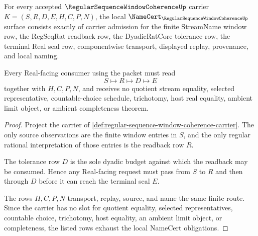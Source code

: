 \begin{theorem}
\label{thm:regular-sequence-window-coherence-namecert-obligations}
For every accepted $\RegularSequenceWindowCoherenceUp$ carrier $K=(S,R,D,E,H,C,P,N)$, the local $\NameCert_{\RegularSequenceWindowCoherenceUp}$ surface consists exactly of carrier admission for the finite StreamName window row, the RegSeqRat readback row, the DyadicRatCore tolerance row, the terminal Real seal row, componentwise transport, displayed replay, provenance, and local naming.

Every Real-facing consumer using the packet must read
$$
S\longmapsto R\longmapsto D\longmapsto E
$$
together with $H,C,P,N$, and receives no quotient stream equality, selected representative, countable-choice schedule, trichotomy, host real equality, ambient limit object, or ambient completeness theorem.
\end{theorem}
\begin{proof}
Project the carrier of \autoref{def:regular-sequence-window-coherence-carrier}. The only source observations are the finite window entries in $S$, and the only regular rational interpretation of those entries is the readback row $R$.

The tolerance row $D$ is the sole dyadic budget against which the readback may be consumed. Hence any Real-facing request must pass from $S$ to $R$ and then through $D$ before it can reach the terminal seal $E$.

The rows $H,C,P,N$ transport, replay, source, and name the same finite route. Since the carrier has no slot for quotient equality, selected representatives, countable choice, trichotomy, host equality, an ambient limit object, or completeness, the listed rows exhaust the local NameCert obligations.
\end{proof}

